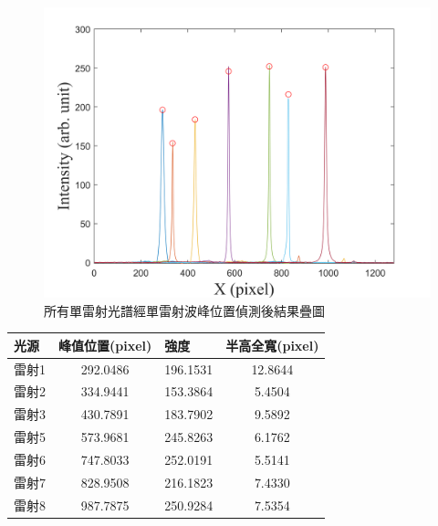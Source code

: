 \begin{figure}[H] %
	\centering %
	\includegraphics[width=16cm]{figures/AllLaserPeak.png} %
	\caption{所有單雷射光譜經單雷射波峰位置偵測後結果疊圖} %
	\label{所有單雷射光譜經單雷射波峰位置偵測後結果疊圖} %
\end{figure}
\begin{center}
	\vspace{0.8cm}
	\label{所有單雷射波峰經波峰偵測後所得出之參數表}
\begin{tabularx}{\textwidth}{m{}<{\centering}c m{}<{\centering}c}
	\hline\hline
	光源&峰值位置(pixel) & 強度 & 半高全寬(pixel)\\		
	\hline
	雷射1&292.0486	&196.1531&	12.8644\\
	雷射2&334.9441	&153.3864&	5.4504\\
	雷射3&430.7891	&183.7902&	9.5892\\
	雷射5&573.9681	&245.8263&	6.1762\\
	雷射6&747.8033	&252.0191&	5.5141\\
	雷射7&828.9508	&216.1823&	7.4330\\
	雷射8&987.7875	&250.9284&	7.5354\\
	\hline\hline
\end{tabularx}
\end{center}
